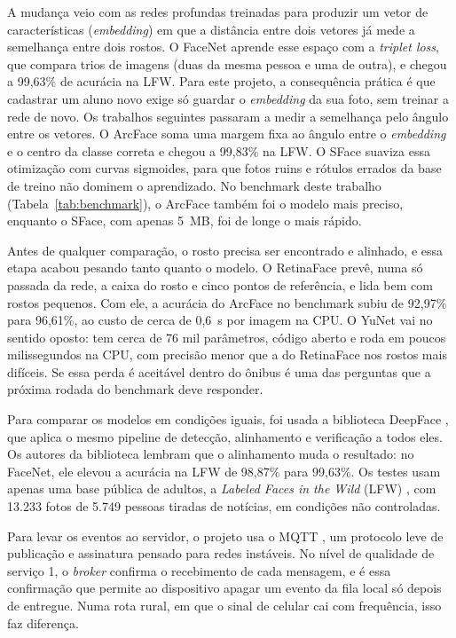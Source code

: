 \documentclass[
    12pt,
    oneside,
    a4paper,
    article,
    english,
    brazil
    ]{abntex2}
\begin{document}
A mudança veio com as redes profundas treinadas para produzir um vetor de
características (\textit{embedding}) em que a distância entre dois vetores já
mede a semelhança entre dois rostos. O FaceNet \cite{schroff2015facenet}
aprende esse espaço com a \textit{triplet loss}, que compara trios de imagens
(duas da mesma pessoa e uma de outra), e chegou a 99,63\% de acurácia na LFW.
Para este projeto, a consequência prática é que cadastrar um aluno novo exige
só guardar o \textit{embedding} da sua foto, sem treinar a rede de novo. Os
trabalhos seguintes passaram a medir a semelhança pelo ângulo entre os
vetores. O ArcFace \cite{deng2019arcface} soma uma margem fixa ao ângulo entre
o \textit{embedding} e o centro da classe correta e chegou a 99,83\% na LFW. O
SFace \cite{zhong2021sface} suaviza essa otimização com curvas sigmoides, para
que fotos ruins e rótulos errados da base de treino não dominem o
aprendizado. No benchmark deste trabalho (Tabela~\ref{tab:benchmark}), o
ArcFace também foi o modelo mais preciso, enquanto o SFace, com apenas 5~MB,
foi de longe o mais rápido.

Antes de qualquer comparação, o rosto precisa ser encontrado e alinhado, e
essa etapa acabou pesando tanto quanto o modelo. O RetinaFace
\cite{deng2020retinaface} prevê, numa só passada da rede, a caixa do rosto e
cinco pontos de referência, e lida bem com rostos pequenos. Com
ele, a acurácia do ArcFace no benchmark subiu de 92,97\% para 96,61\%, ao custo
de cerca de 0,6~s por imagem na CPU. O YuNet \cite{wu2023yunet} vai no sentido
oposto: tem cerca de 76 mil parâmetros, código aberto e roda em poucos
milissegundos na CPU, com precisão menor que a do RetinaFace nos rostos mais
difíceis. Se essa perda é aceitável dentro do ônibus é uma das perguntas que
a próxima rodada do benchmark deve responder.

Para comparar os modelos em condições iguais, foi usada a biblioteca DeepFace
\cite{serengil2020lightface}, que aplica o mesmo pipeline de detecção,
alinhamento e verificação a todos eles. Os autores da biblioteca lembram que
o alinhamento muda o resultado: no FaceNet, ele elevou a acurácia na
LFW de 98,87\% para 99,63\%. Os testes usam apenas uma base pública de
adultos, a \textit{Labeled Faces in the Wild} (LFW) \cite{huang2007lfw}, com
13.233 fotos de 5.749 pessoas tiradas de notícias, em condições não
controladas.

Para levar os eventos ao servidor, o projeto usa o MQTT \cite{oasis2019mqtt},
um protocolo leve de publicação e assinatura pensado para redes instáveis. No
nível de qualidade de serviço 1, o \textit{broker} confirma o recebimento de
cada mensagem, e é essa confirmação que permite ao dispositivo apagar um
evento da fila local só depois de entregue. Numa rota rural, em que o sinal
de celular cai com frequência, isso faz diferença.
\end{document}
